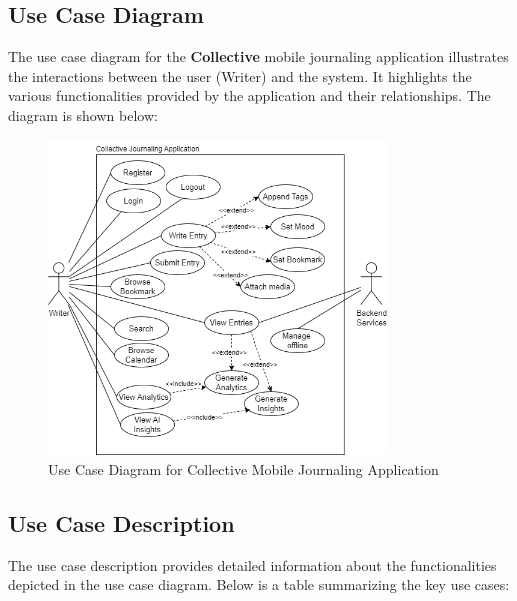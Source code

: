 \subsection{Use Case Diagram}\label{subsec:usecaseDiagram}

The use case diagram for the \textbf{Collective} mobile journaling application illustrates the interactions between the user (Writer) and the system. It highlights the various functionalities provided by the application and their relationships. The diagram is shown below:

\begin{figure}[H]
\centering
\includegraphics[width=0.8\textwidth]{files/imgs/usecase_diagram.png}
\caption{Use Case Diagram for Collective Mobile Journaling Application}
\label{fig:usecase-diagram}
\end{figure}

\subsection{Use Case Description}\label{subsec:usecaseDescription}

The use case description provides detailed information about the functionalities depicted in the use case diagram. Below is a table summarizing the key use cases:

